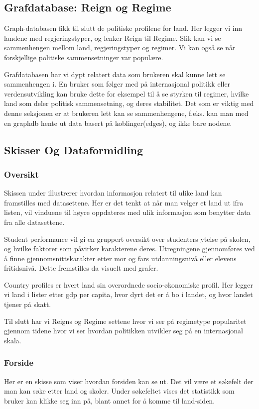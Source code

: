 \subsection{Grafdatabase: Reign og Regime}
Graph-databasen fikk til slutt de politiske profilene for land. Her legger vi inn landene med regjeringstyper, og lenker Reign til Regime. Slik kan vi se sammenhengen mellom land, regjeringstyper og regimer. Vi kan også se når forskjellige politiske sammensetninger var populære. 

Grafdatabasen har vi dypt relatert data som brukeren skal kunne lett se sammenhengen i. En bruker som følger med på internasjonal politikk eller verdensutvikling kan bruke dette for eksempel til å se styrken til regimer, hvilke land som deler politisk sammensetning, og deres stabilitet. Det som er viktig med denne seksjonen er at brukeren lett kan se sammenhengene, f.eks. kan man med en graphdb hente ut data basert på koblinger(edges), og ikke bare nodene.


\subsection{Skisser Og Dataformidling}
\subsubsection{Oversikt}
Skissen under illustrerer hvordan informasjon relatert til ulike land kan framstilles med datasettene. Her er det tenkt at når man velger et land ut ifra listen, vil vinduene til høyre oppdateres med ulik informasjon som benytter data fra alle datasettene.

Student performance vil gi en gruppert oversikt over studenters ytelse på skolen, og hvilke faktorer som påvirker karakterene deres. Utregningene gjennomføres ved å finne gjennomsnittskarakter etter mor og fars utdanningsnivå eller elevens fritidsnivå. Dette fremstilles da visuelt med grafer.

Country profiles er hvert land sin overordnede socio-økonomiske profil. Her legger vi land i lister etter gdp per capita, hvor dyrt det er å bo i landet, og hvor landet tjener på skatt.

Til slutt har vi Reigns og Regime settene hvor vi ser på regimetype popularitet gjennom tidene hvor vi ser hvordan politikken utvikler seg på en internasjonal skala.


\subsubsection{Forside}
Her er en skisse som viser hvordan forsiden kan se ut. Det vil være et søkefelt der man kan søke etter land og skoler. Under søkefeltet vises det statistikk som bruker kan klikke seg inn på, blant annet for å komme til land-siden.

